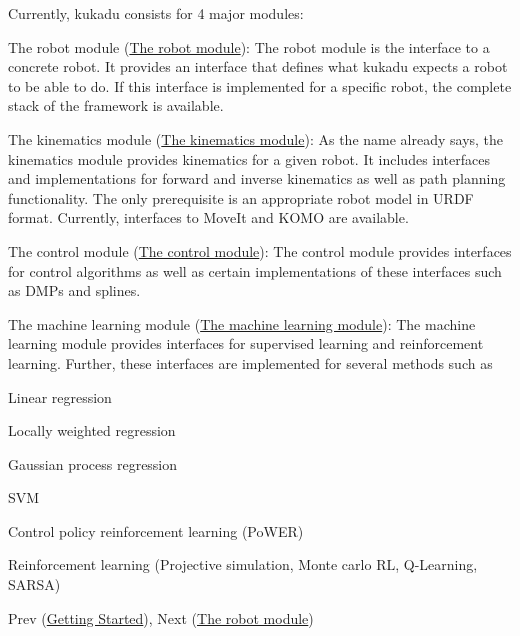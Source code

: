 Currently, kukadu consists for 4 major modules\+:
\begin{DoxyItemize}
\item The robot module (\hyperlink{robotpage}{The robot module})\+: The robot module is the interface to a concrete robot. It provides an interface that defines what kukadu expects a robot to be able to do. If this interface is implemented for a specific robot, the complete stack of the framework is available.
\item The kinematics module (\hyperlink{kinematicspage}{The kinematics module})\+: As the name already says, the kinematics module provides kinematics for a given robot. It includes interfaces and implementations for forward and inverse kinematics as well as path planning functionality. The only prerequisite is an appropriate robot model in U\+R\+DF format. Currently, interfaces to Move\+It and K\+O\+MO are available.
\item The control module (\hyperlink{controlpage}{The control module})\+: The control module provides interfaces for control algorithms as well as certain implementations of these interfaces such as D\+M\+Ps and splines.
\item The machine learning module (\hyperlink{mlpage}{The machine learning module})\+: The machine learning module provides interfaces for supervised learning and reinforcement learning. Further, these interfaces are implemented for several methods such as
\begin{DoxyItemize}
\item Linear regression
\item Locally weighted regression
\item Gaussian process regression
\item S\+VM
\item Control policy reinforcement learning (Po\+W\+ER)
\item Reinforcement learning (Projective simulation, Monte carlo RL, Q-\/\+Learning, S\+A\+R\+SA)
\end{DoxyItemize}
\end{DoxyItemize}

Prev (\hyperlink{gettingstartedpage}{Getting Started}), Next (\hyperlink{robotpage}{The robot module}) 